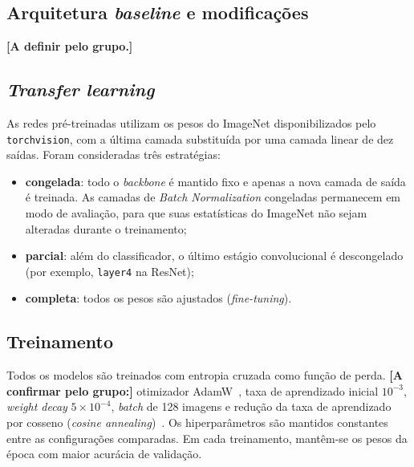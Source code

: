 \subsection{Arquitetura \textit{baseline} e modificações}
\textbf{[A definir pelo grupo.]}

\subsection{\textit{Transfer learning}}

As redes pré-treinadas utilizam os pesos do ImageNet disponibilizados pelo
\texttt{torchvision}, com a última camada substituída por uma camada linear de
dez saídas. Foram consideradas três estratégias:
\begin{itemize}
  \item \textbf{congelada}: todo o \textit{backbone} é mantido fixo e apenas a
        nova camada de saída é treinada. As camadas de \textit{Batch
        Normalization} congeladas permanecem em modo de avaliação, para que
        suas estatísticas do ImageNet não sejam alteradas durante o
        treinamento;
  \item \textbf{parcial}: além do classificador, o último estágio
        convolucional é descongelado (por exemplo, \texttt{layer4} na
        ResNet);
  \item \textbf{completa}: todos os pesos são ajustados (\textit{fine-tuning}).
\end{itemize}

\subsection{Treinamento}
Todos os modelos são treinados com entropia cruzada como função de perda.
\textbf{[A confirmar pelo grupo:]} otimizador AdamW~\cite{loshchilov2019decoupled},
taxa de aprendizado inicial $10^{-3}$, \textit{weight decay} $5 \times 10^{-4}$,
\textit{batch} de 128 imagens e redução da taxa de aprendizado por cosseno
(\textit{cosine annealing})~\cite{loshchilov2017sgdr}. Os hiperparâmetros são
mantidos constantes entre as configurações comparadas. Em cada treinamento,
mantêm-se os pesos da época com maior acurácia de validação.

